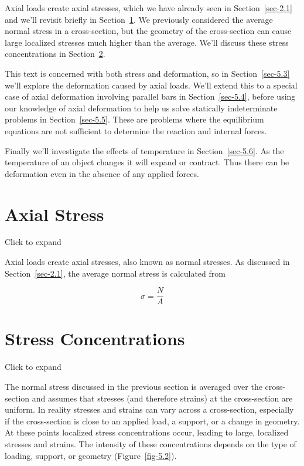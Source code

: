\documentclass[
  letterpaper,
  DIV=11,
  numbers=noendperiod]{scrreprt}
\theoremstyle{definition}
\theoremstyle{remark}
\begin{document}
Axial loads create axial stresses, which we have already seen in
Section~\ref{sec-2.1} and we'll revisit briefly in
Section~\ref{sec-5.1}. We previously considered the average normal
stress in a cross-section, but the geometry of the cross-section can
cause large localized stresses much higher than the average. We'll
discuss these stress concentrations in Section~\ref{sec-5.2}.

This text is concerned with both stress and deformation, so in
Section~\ref{sec-5.3} we'll explore the deformation caused by axial
loads. We'll extend this to a special case of axial deformation
involving parallel bars in Section~\ref{sec-5.4}, before using our
knowledge of axial deformation to help us solve statically indeterminate
problems in Section~\ref{sec-5.5}. These are problems where the
equilibrium equations are not sufficient to determine the reaction and
internal forces.

Finally we'll investigate the effects of temperature in
Section~\ref{sec-5.6}. As the temperature of an object changes it will
expand or contract. Thus there can be deformation even in the absence of
any applied forces.

\section{Axial Stress}\label{sec-5.1}

Click to expand

Axial loads create axial stresses, also known as normal stresses. As
discussed in Section~\ref{sec-2.1}, the average normal stress is
calculated from

\[
\sigma=\frac{N}{A}
\]

\section{Stress Concentrations}\label{sec-5.2}

Click to expand

The normal stress discussed in the previous section is averaged over the
cross-section and assumes that stresses (and therefore strains) at the
cross-section are uniform. In reality stresses and strains can vary
across a cross-section, especially if the cross-section is close to an
applied load, a support, or a change in geometry. At these points
localized stress concentrations occur, leading to large, localized
stresses and strains. The intensity of these concentrations depends on
the type of loading, support, or geometry (Figure~\ref{fig-5.2}).
\end{document}
